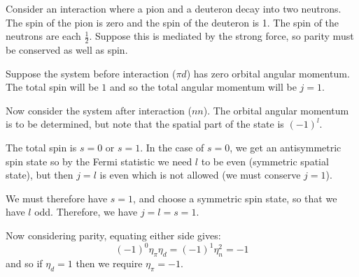 \documentclass[../Main.tex]{subfiles}
\begin{document}
\begin{example}
    Consider an interaction where a pion and a deuteron decay into two neutrons. The spin of the pion is zero and the spin of the deuteron is 1. The spin of the neutrons are each $\frac12$. Suppose this is mediated by the strong force, so parity must be conserved as well as spin.

    Suppose the system before interaction ($\pi d$) has zero orbital angular momentum. The total spin will be $1$ and so the total angular momentum will be $j = 1$.

    Now consider the system after interaction ($nn$). The orbital angular momentum is to be determined, but note that the spatial part of the state is $(-1)^l$. 

    The total spin is $s = 0$ or $s = 1$. In the case of $s = 0$, we get an antisymmetric spin state so by the Fermi statistic we need $l$ to be even (symmetric spatial state), but then $j = l$ is even which is not allowed (we must conserve $j = 1$).

    We must therefore have $s = 1$, and choose a symmetric spin state, so that we have $l$ odd. Therefore, we have $j = l = s = 1$.

    Now considering parity, equating either side gives:
    \begin{equation*}
        (-1)^0 \eta_\pi \eta_d = (-1)^1 \eta_n^2 = -1
    \end{equation*}
    and so if $\eta_d = 1$ then we require $\eta_\pi = -1$.
\end{example}
\end{document}
